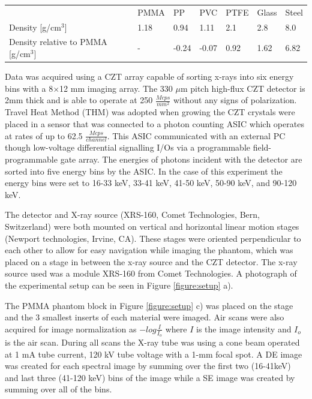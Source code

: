 \documentclass[a4paper,11pt]{article}
\begin{document}
\begin{table}[]
\begin{tabular}{lllllll}
                                                       & PMMA & PP    & PVC   & PTFE & Glass & Steel \\
Density {[}g/cm$^3${]}                  & 1.18 & 0.94  & 1.11  & 2.1  & 2.8   & 8.0   \\
Density relative to PMMA {[}g/cm$^3${]} & -    & -0.24 & -0.07 & 0.92 & 1.62  & 6.82 
\end{tabular}
\label{table:densities}
\end{table}

Data was acquired using a CZT array capable of sorting x-rays into six energy bins with a 8$\times$12 mm imaging array. The 330 $\mu$m pitch high-flux CZT detector is 2mm thick and is able to operate at 250 $\frac{Mcps}{mm^2}$ without any signs of polarization. Travel Heat Method (THM) was adopted when growing the CZT crystals were placed in a sensor that was connected to a photon counting ASIC which operates at rates of up to 62.5 $\frac{Mcps}{channel}$. This ASIC communicated with an external PC though low-voltage differential signalling I/Os via a programmable field-programmable gate array. The energies of photons incident with the detector are sorted into five energy bins by the ASIC. In the case of this experiment the energy bins were set to 16-33 keV, 33-41 keV, 41-50 keV, 50-90 keV, and 90-120 keV.

The detector and X-ray source (XRS-160, Comet Technologies, Bern, Switzerland) were both mounted on vertical and horizontal linear motion stages (Newport technologies, Irvine, CA). These stages were oriented perpendicular to each other to allow for easy navigation while imaging the phantom, which was placed on a stage in between the x-ray source and the CZT detector. The x-ray source used was a module XRS-160 from Comet Technologies. A photograph of the experimental setup can be seen in Figure \ref{figure:setup} a). 

The PMMA phantom block in Figure \ref{figure:setup} c) was placed on the stage and the 3 smallest inserts of each material were imaged. Air scans were also acquired for image normalization as $-log\frac{I}{I_o}$ where $I$ is the image intensity and $I_o$ is the air scan. During all scans the X-ray tube was using a cone beam operated at 1 mA tube current, 120 kV tube voltage with a 1-mm focal spot. A DE image was created for each spectral image by summing over the first two (16-41keV) and last three 
(41-120 keV) bins of the image while a SE image was created by summing over all of the bins.
\end{document}
